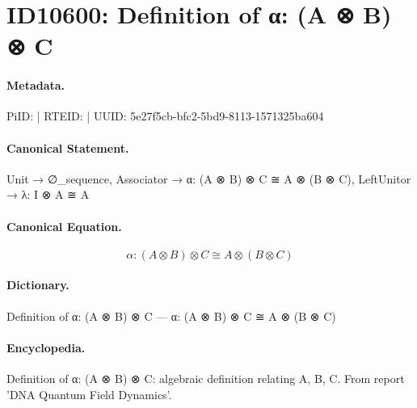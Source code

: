 \section*{ID10600: Definition of α: (A ⊗ B) ⊗ C}
\paragraph{Metadata.}
PiID:  | RTEID:  | UUID: 5e27f5cb-bfc2-5bd9-8113-1571325ba604

\paragraph{Canonical Statement.}
Unit → ∅\_sequence, Associator → α: (A ⊗ B) ⊗ C ≅ A ⊗ (B ⊗ C), LeftUnitor → λ: I ⊗ A ≅ A

\paragraph{Canonical Equation.}
\[
α: (A ⊗ B) ⊗ C ≅ A ⊗ (B ⊗ C)
\]

\paragraph{Dictionary.}
Definition of α: (A ⊗ B) ⊗ C — α: (A ⊗ B) ⊗ C ≅ A ⊗ (B ⊗ C)

\paragraph{Encyclopedia.}
Definition of α: (A ⊗ B) ⊗ C: algebraic definition relating A, B, C. From report 'DNA Quantum Field Dynamics'.
